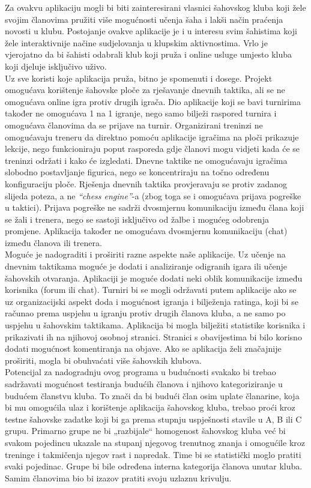 	     	\noindent   Za ovakvu aplikaciju mogli bi biti zainteresirani vlasnici šahovskog
			kluba koji žele svojim članovima pružiti više mogućnosti učenja šaha i
			lakši način praćenja novosti u klubu. Postojanje ovakve aplikacije je i
			u interesu svim šahistima koji žele interaktivnije načine sudjelovanja u
			klupskim aktivnostima. Vrlo je vjerojatno da bi šahisti odabrali klub
			koji pruža i online usluge umjesto kluba koji djeluje isključivo uživo. \\
		    Uz sve koristi koje aplikacija pruža, bitno je spomenuti i dosege.
			Projekt omogućava korištenje šahovske ploče za rješavanje dnevnih
			taktika, ali se ne omogućava online igra protiv drugih igrača. Dio
			aplikacije koji se bavi turnirima također ne omogućava 1 na 1 igranje,
			nego samo bilježi raspored turnira i omogućava članovima da se prijave
			na turnir. Organizirani treninzi ne omogućavaju treneru da direktno
			pomoću aplikacije igračima na ploči prikazuje lekcije, nego
			funkcioniraju poput rasporeda gdje članovi mogu vidjeti kada će se
			treninzi održati i kako će izgledati. Dnevne taktike ne omogućavaju
			igračima slobodno postavljanje figurica, nego se koncentriraju na točno
			određenu konfiguraciju ploče. Rješenja dnevnih taktika provjeravaju se
			protiv zadanog slijeda poteza, a ne \textit{``chess engine''}-a (zbog toga se i
			omogućava prijava pogreške u taktici). Prijava pogreške ne sadrži
			dvosmjernu komunikaciju između člana koji se žali i trenera, nego se
			sastoji isključivo od žalbe i mogućeg odobrenja promjene. Aplikacija
			također ne omogućava dvosmjernu komunikaciju (chat) između članova ili
			trenera.\\
			Moguće je nadograditi i proširiti razne aspekte naše aplikacije. Uz
			učenje na dnevnim taktikama moguće je dodati i analiziranje odigranih
			igara ili učenje šahovskih otvaranja. Aplikaciji je moguće dodati neki
			oblik komunikacije između korisnika (forum ili chat). Turniri bi se
			mogli održavati putem aplikacije ako se uz organizacijski aspekt doda i
			mogućnost igranja i bilježenja ratinga, koji bi se računao prema
			uspjehu u igranju protiv drugih članova kluba, a ne samo po uspjehu u
			šahovskim taktikama. Aplikacija bi mogla bilježiti statistike korisnika i
			prikazivati ih na njihovoj osobnoj stranici. Stranici s obavijestima bi
			bilo korisno dodati mogućnost komentiranja na objave. Ako se
			aplikacija želi značajnije proširiti, mogla bi obuhvaćati više šahovskih
			klubova.\\
		    Potencijal za nadogradnju ovog programa u budućnosti svakako bi trebao sadržavati mogućnost testiranja budućih članova i njihovo kategoriziranje u budućem članstvu kluba. To znači da bi budući član osim uplate članarine, koja bi mu omogućila ulaz i korištenje aplikacija šahovskog kluba, trebao proći kroz testne šahovske zadatke koji bi ga prema stupnju uspješnosti stavile u A, B ili C grupu. Primarno grupe ne bi „razbijale“ homogenost šahovskog kluba već bi svakom pojedincu ukazale na stupanj njegovog trenutnog znanja i omogućile kroz treninge i takmičenja njegov rast i napredak. Time bi se statistički moglo pratiti svaki pojedinac. Grupe bi bile određena interna kategorija članova unutar kluba. Samim članovima bio bi izazov pratiti svoju uzlaznu krivulju. \\
